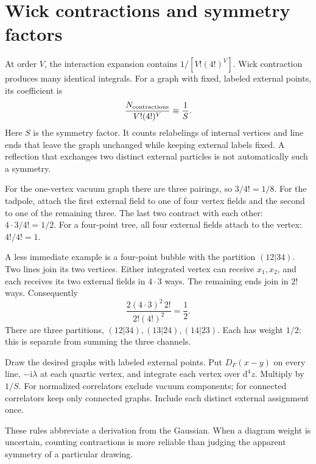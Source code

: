 \documentclass[11pt]{article}
\newcommand{\dd}{\mathrm d}
\newcommand{\ii}{\mathrm i}
\newcommand{\module}[1]{\clearpage\section{#1}}
\begin{document}
\module{Wick contractions and symmetry factors}
At order \(V\), the interaction expansion contains
\(1/[V!(4!)^V]\). Wick contraction produces many identical integrals.
For a graph with fixed, labeled external points, its coefficient is
\begin{equation}
 \frac{N_{\rm contractions}}{V!(4!)^V}\equiv\frac{1}{S}.
 \label{eq:symmetry}
\end{equation}
Here \(S\) is the symmetry factor. It counts relabelings of internal
vertices and line ends that leave the graph unchanged while keeping
external labels fixed. A reflection that exchanges two distinct
external particles is not automatically such a symmetry.

\begin{center}
\end{center}
For the one-vertex vacuum graph there are three pairings, so
\(3/4!=1/8\). For the tadpole, attach the first external field to one
of four vertex fields and the second to one of the remaining three.
The last two contract with each other: \(4\cdot3/4!=1/2\).
For a four-point tree, all four external fields attach to the vertex:
\(4!/4!=1\).

A less immediate example is a four-point bubble with the partition
\((12|34)\). Two lines join its two vertices. Either integrated vertex
can receive \(x_1,x_2\), and each receives its two external fields in
\(4\cdot3\) ways. The remaining ends join in \(2!\) ways. Consequently
\begin{equation}
 \frac{2(4\cdot3)^2\,2!}{2!(4!)^2}=\frac12.
 \label{eq:bubblecount}
\end{equation}
There are three partitions, \((12|34),(13|24),(14|23)\). Each has
weight \(1/2\); this is separate from summing the three channels.

\begin{keyidea}
Draw the desired graphs with labeled external points. Put \(D_F(x-y)\)
on every line, \(-\ii\lambda\) at each quartic vertex, and integrate
each vertex over \(\dd^4z\). Multiply by \(1/S\). For normalized
correlators exclude vacuum components; for connected correlators keep
only connected graphs. Include each distinct external assignment once.
\end{keyidea}
These rules abbreviate a derivation from the Gaussian. When a diagram
weight is uncertain, counting contractions is more reliable than
judging the apparent symmetry of a particular drawing.
\end{document}
